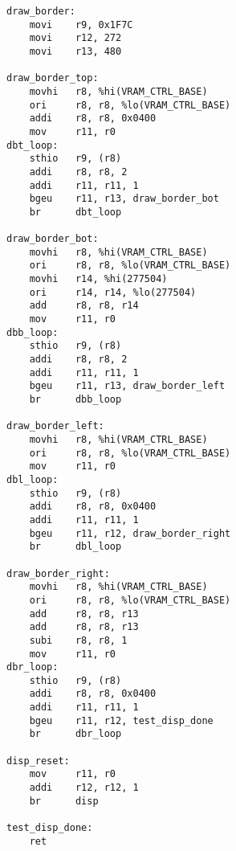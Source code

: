 \begin{lstlisting}
draw_border:
	movi	r9, 0x1F7C
	movi	r12, 272
	movi	r13, 480

draw_border_top:
	movhi	r8, %hi(VRAM_CTRL_BASE)
	ori		r8, r8, %lo(VRAM_CTRL_BASE)
	addi	r8, r8, 0x0400
	mov		r11, r0
dbt_loop:
	sthio	r9, (r8)
	addi	r8, r8, 2
	addi	r11, r11, 1
	bgeu	r11, r13, draw_border_bot
	br		dbt_loop

draw_border_bot:
	movhi	r8, %hi(VRAM_CTRL_BASE)
	ori		r8, r8, %lo(VRAM_CTRL_BASE)
	movhi	r14, %hi(277504)
	ori		r14, r14, %lo(277504)
	add		r8, r8, r14
	mov		r11, r0
dbb_loop:
	sthio	r9, (r8)
	addi	r8, r8, 2
	addi	r11, r11, 1
	bgeu	r11, r13, draw_border_left
	br		dbb_loop

draw_border_left:
	movhi	r8, %hi(VRAM_CTRL_BASE)
	ori		r8, r8, %lo(VRAM_CTRL_BASE)
	mov		r11, r0
dbl_loop:
	sthio	r9, (r8)
	addi	r8, r8, 0x0400
	addi	r11, r11, 1
	bgeu	r11, r12, draw_border_right
	br		dbl_loop

draw_border_right:
	movhi	r8, %hi(VRAM_CTRL_BASE)
	ori		r8, r8, %lo(VRAM_CTRL_BASE)
	add		r8, r8, r13
	add		r8, r8, r13
	subi	r8, r8, 1
	mov		r11, r0
dbr_loop:
	sthio	r9, (r8)
	addi	r8, r8, 0x0400
	addi	r11, r11, 1
	bgeu	r11, r12, test_disp_done
	br		dbr_loop

disp_reset:
	mov		r11, r0
	addi	r12, r12, 1
	br		disp

test_disp_done:
	ret
\end{lstlisting}
